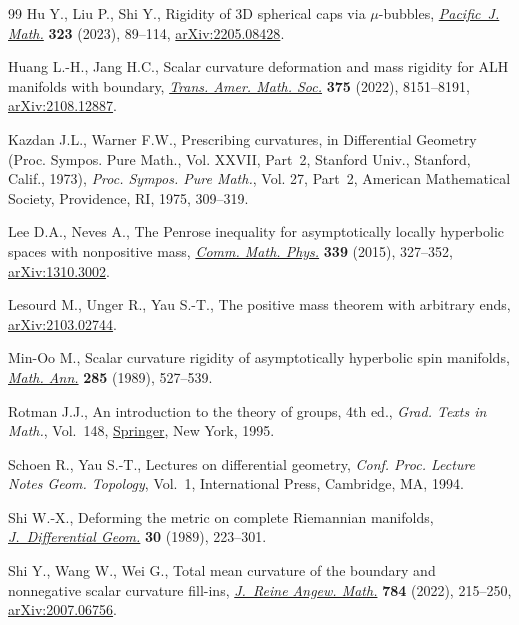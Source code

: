 \documentclass[10pt,a4paper]{amsart}
\numberwithin{equation}{section}
\begin{document}
\begin{thebibliography}{99}
Hu Y., Liu P., Shi Y., Rigidity of 3{D} spherical caps via {$\mu$}-bubbles,
  \href{https://doi.org/10.2140/pjm.2023.323.89}{\textit{Pacific~J. Math.}} \textbf{323} (2023), 89--114, \href{https://arxiv.org/abs/2205.08428}{arXiv:2205.08428}.

Huang L.-H., Jang H.C., Scalar curvature deformation and mass rigidity for {ALH}
  manifolds with boundary, \href{https://doi.org/10.1090/tran/8755}{\textit{Trans. Amer. Math. Soc.}} \textbf{375}
  (2022), 8151--8191, \href{https://arxiv.org/abs/2108.12887}{arXiv:2108.12887}.

Kazdan J.L., Warner F.W., Prescribing curvatures, in Differential {G}eometry
  ({P}roc. {S}ympos. {P}ure {M}ath., {V}ol. {XXVII}, {P}art~2, {S}tanford
  {U}niv., {S}tanford, {C}alif., 1973), \textit{Proc. Sympos. Pure Math.}, Vol.
  27, Part~2, American Mathematical Society, Providence, RI, 1975, 309--319.

Lee D.A., Neves A., The {P}enrose inequality for asymptotically locally
  hyperbolic spaces with nonpositive mass, \href{https://doi.org/10.1007/s00220-015-2421-x}{\textit{Comm. Math. Phys.}}
  \textbf{339} (2015), 327--352, \href{https://arxiv.org/abs/1310.3002}{arXiv:1310.3002}.

Lesourd M., Unger R., Yau S.-T., The positive mass theorem with arbitrary ends,
  \href{https://arxiv.org/abs/2103.02744}{arXiv:2103.02744}.

Min-Oo M., Scalar curvature rigidity of asymptotically hyperbolic spin
  manifolds, \href{https://doi.org/10.1007/BF01452046}{\textit{Math. Ann.}} \textbf{285} (1989), 527--539.

Rotman J.J., An introduction to the theory of groups, 4th ed., \textit{Grad. Texts in
  Math.}, Vol.~148, \href{https://doi.org/10.1007/978-1-4612-4176-8}{Springer}, New York, 1995.

Schoen R., Yau S.-T., Lectures on differential geometry, \textit{Conf. Proc.
  Lecture Notes Geom. Topology}, Vol.~1, International Press, Cambridge, MA,
  1994.

Shi W.-X., Deforming the metric on complete {R}iemannian manifolds,
  \href{https://doi.org/10.4310/jdg/1214443292}{\textit{J.~Differential Geom.}} \textbf{30} (1989), 223--301.

Shi Y., Wang W., Wei G., Total mean curvature of the boundary and nonnegative
  scalar curvature fill-ins, \href{https://doi.org/10.1515/crelle-2021-0072}{\textit{J.~Reine Angew. Math.}} \textbf{784}
  (2022), 215--250, \href{https://arxiv.org/abs/2007.06756}{arXiv:2007.06756}.


\end{thebibliography}
\end{document}
